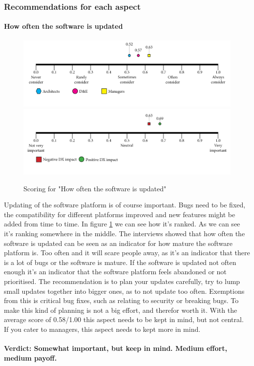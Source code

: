     \subsubsection{Recommendations for each aspect}
    \paragraph{How often the software is updated}
    \begin{figure}[H]
        \centering
        \includegraphics[width=\linewidth]{scorelines/aspect1.png}
        \includegraphics[width=\linewidth]{dxscorelines/dxaspect1.png}
        \caption{Scoring for "How often the software is updated"}
        \label{fig:aspect1}
    \end{figure}
    Updating of the software platform is of course important. Bugs need to be fixed, the compatibility for different platforms improved and new features might be added from time to time. In figure \ref{fig:aspect1} we can see how it's ranked. As we can see it's ranking somewhere in the middle. The interviews showed that how often the software is updated can be seen as an indicator for how mature the software platform is. Too often and it will scare people away, as it's an indicator that there is a lot of bugs or the software is mature. If the software is updated not often enough it's an indicator that the software platform feels abandoned or not prioritised. The recommendation is to plan your updates carefully, try to lump small updates together into bigger ones, as to not update too often. Exemptions from this is critical bug fixes, such as relating to security or breaking bugs. To make this kind of planning is not a big effort, and therefor worth it. With the average score of 0.58/1.00 this aspect needs to be kept in mind, but not central. If you cater to managers, this aspect needs to kept more in mind. \\ \\
    \textbf{Verdict: Somewhat important, but keep in mind. Medium effort, medium payoff.}
